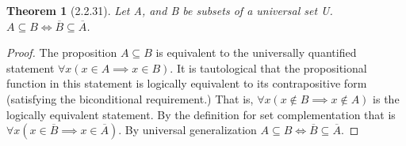 \documentclass[a4paper, 12pt]{article}
\theoremstyle{plain}
\newtheorem*{theorem*}{Theorem}
\begin{document}
	
	\begin{theorem*}[2.2.31]
		Let A, and B be subsets of a universal set U. \newline $A \subseteq B \iff \overline{B} \subseteq \overline{A}$.
	\end{theorem*}
	
	\begin{proof}
		The proposition $A \subseteq B$ is equivalent to the universally quantified statement $\forall x ( x \in A \implies x \in B)$. It is tautological that the propositional function in this statement is logically equivalent to its contrapositive form (satisfying the biconditional requirement.) That is,  $\forall x (x \notin B \implies x \notin A)$ is the logically equivalent statement. By the definition for set complementation that is $\forall x (x \in \overline{B} \implies x \in \overline{A})$. By universal generalization \newline $A \subseteq B \iff \overline{B} \subseteq \overline{A}$.
	\end{proof}
\end{document}
